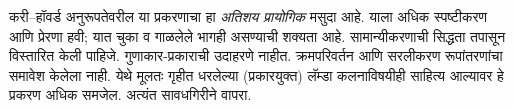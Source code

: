 \documentclass[../../../include/open-logic-chapter]{subfiles}
\begin{document}

\begin{editorial}
  करी--हॉवर्ड अनुरूपतेवरील या प्रकरणाचा हा \emph{अतिशय प्रायोगिक}
  मसुदा आहे. याला अधिक स्पष्टीकरण आणि प्रेरणा हवी; यात चुका
  व गाळलेले भागही असण्याची शक्यता आहे. सामान्यीकरणाची सिद्धता
  तपासून विस्तारित केली पाहिजे. गुणाकार-प्रकाराची उदाहरणे नाहीत.
  क्रमपरिवर्तन आणि सरलीकरण रूपांतरणांचा समावेश केलेला नाही.
  येथे मूलतः गृहीत धरलेल्या (प्रकारयुक्त) लॅम्डा कलनाविषयीही
  साहित्य आल्यावर हे प्रकरण अधिक समजेल. अत्यंत सावधगिरीने वापरा.
\end{editorial}


\OLEndChapterHook
\end{document}
